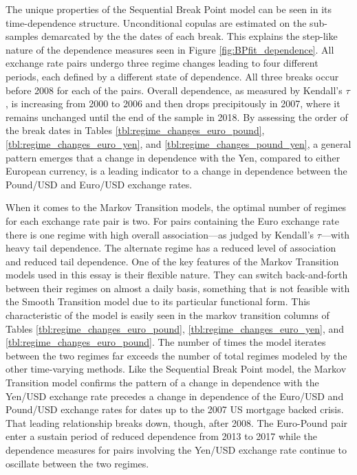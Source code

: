 The unique properties of the Sequential Break Point model can be seen in its time-dependence structure. Unconditional copulas are estimated on the sub-samples demarcated by the the dates of each break. This explains the step-like nature of the dependence measures seen in Figure \ref{fig:BPfit_dependence}. All exchange rate pairs undergo three regime changes leading to four different periods, each defined by a different state of dependence. All three breaks occur before 2008 for each of the pairs. Overall dependence, as measured by Kendall's $\tau$, is increasing from 2000 to 2006 and then drops precipitously in 2007, where it remains unchanged until the end of the sample in 2018. By assessing the order of the break dates in Tables \ref{tbl:regime_changes_euro_pound}, \ref{tbl:regime_changes_euro_yen}, and \ref{tbl:regime_changes_pound_yen}, a general pattern emerges that a change in dependence with the Yen, compared to either European currency, is a leading indicator to a change in dependence between the Pound/USD and Euro/USD exchange rates.

When it comes to the Markov Transition models, the optimal number of regimes for each exchange rate pair is two. For pairs containing the Euro exchange rate there is one regime with high overall association---as judged by Kendall's $\tau$---with heavy tail dependence. The alternate regime has a reduced level of association and reduced tail dependence. One of the key features of the Markov Transition models used in this essay is their flexible nature. They can switch back-and-forth between their regimes on almost a daily basis, something that is not feasible with the Smooth Transition model due to its particular functional form. This characteristic of the model is easily seen in the markov transition columns of Tables \ref{tbl:regime_changes_euro_pound}, \ref{tbl:regime_changes_euro_yen}, and \ref{tbl:regime_changes_euro_pound}. The number of times the model iterates between the two regimes far exceeds the number of total regimes modeled by the other time-varying methods. Like the Sequential Break Point model, the Markov Transition model confirms the pattern of a change in dependence with the Yen/USD exchange rate precedes a change in dependence of the Euro/USD and Pound/USD exchange rates for dates up to the 2007 US mortgage backed crisis. That leading relationship breaks down, though, after 2008. The Euro-Pound pair enter a sustain period of reduced dependence from 2013 to 2017 while the dependence measures for pairs involving the Yen/USD exchange rate continue to oscillate between the two regimes.

